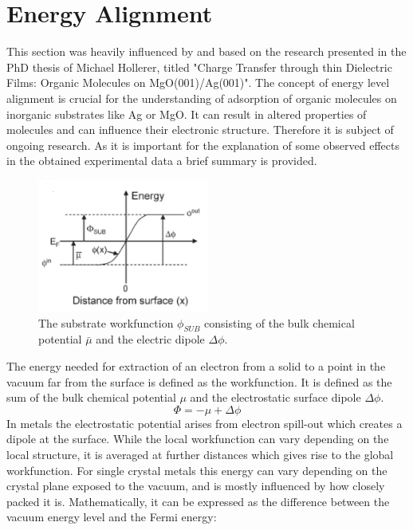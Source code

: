 %

\newpage


\section{Energy Alignment}
This section was heavily influenced by and based on the research presented in the PhD thesis of Michael Hollerer, titled "Charge Transfer through thin
Dielectric Films: Organic Molecules
on MgO(001)/Ag(001)". \cite{hollerercharge}
The concept of energy level alignment is crucial for the understanding of adsorption of organic molecules on inorganic substrates like Ag or MgO.
It can result in altered properties of molecules and can influence their electronic structure.
Therefore it is subject of ongoing research. \cite{braun2009energy}
As it is important for the explanation of some observed effects in the obtained experimental data a brief summary is provided.\\
\begin{figure}
    \centering
    \includegraphics[width=0.5\textwidth]{graphics/workfunction.PNG}
    \caption{The substrate workfunction  $\phi_{SUB}$ consisting of the bulk chemical potential $\bar{\mu}$ and the electric dipole $\Delta \phi$. \cite{hollerercharge}}
    \label{fig:workwork}
\end{figure}
\noindent The energy needed for extraction of an electron from a solid to a point in the vacuum far from the surface is defined as the workfunction. 
It is defined as the sum of the bulk chemical potential $\mu$ and the electrostatic surface dipole $\Delta \phi$.
\begin{equation}
    \Phi = - \mu + \Delta \phi
\end{equation}
In metals the electrostatic potential arises from electron spill-out which creates a dipole at the surface.
While the local workfunction can vary depending on the local structure, it is averaged at further distances which gives rise to the global workfunction.
For single crystal metals this energy can vary depending on the crystal plane exposed to the vacuum, and is mostly influenced by how closely packed it is.
Mathematically, it can be expressed as the difference between the vacuum energy level and the Fermi energy:

